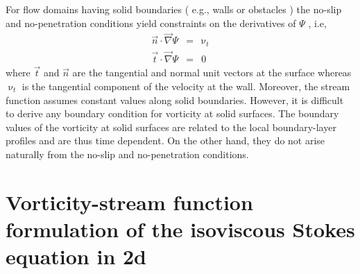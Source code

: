 For flow domains having solid boundaries ( e.g., walls or obstacles ) the
no-slip and no-penetration conditions yield constraints on the derivatives of $\Psi$ , i.e,
\begin{eqnarray}
\vec{n} \cdot \vec\nabla \Psi &=& \upnu_t \\
\vec{t} \cdot \vec\nabla \Psi &=& 0
\end{eqnarray}
where $\vec{t}$ and $\vec{n}$ are the tangential and normal unit vectors at the surface whereas 
$\upnu_t$ is the tangential component of the velocity at the wall. Moreover, the stream
function assumes constant values along solid boundaries. 
However, it is difficult to
derive any boundary condition for vorticity at solid surfaces. The boundary values
of the vorticity at solid surfaces are related to the local boundary-layer profiles
and are thus time dependent. On the other hand, they do not arise naturally
from the no-slip and no-penetration conditions. 





\section{Vorticity-stream function formulation of the isoviscous Stokes equation in 2d \label{ss:vsf1}}

